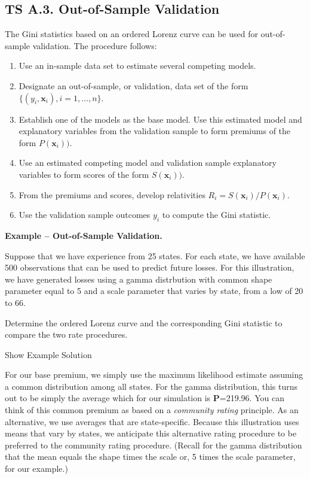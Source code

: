 \documentclass[]{book}
\providecommand{\tightlist}{%
  \setlength{\itemsep}{0pt}\setlength{\parskip}{0pt}}
\theoremstyle{definition}
\theoremstyle{definition}
\theoremstyle{definition}
\theoremstyle{remark}
\begin{document}
\subsection*{TS A.3. Out-of-Sample
Validation}\label{ts-a.3.-out-of-sample-validation}

The Gini statistics based on an ordered Lorenz curve can be used for
out-of-sample validation. The procedure follows:

\begin{enumerate}
\def\labelenumi{\arabic{enumi}.}
\tightlist
\item
  Use an in-sample data set to estimate several competing models.
\item
  Designate an out-of-sample, or validation, data set of the form
  \(\{(y_i, \mathbf{x}_i), i=1,\ldots,n\}\).
\item
  Establish one of the models as the base model. Use this estimated
  model and explanatory variables from the validation sample to form
  premiums of the form \(P(\mathbf{x}_i))\).
\item
  Use an estimated competing model and validation sample explanatory
  variables to form scores of the form \(S(\mathbf{x}_i))\).
\item
  From the premiums and scores, develop relativities
  \(R_i =S(\mathbf{x}_i)/P(\mathbf{x}_i)\).
\item
  Use the validation sample outcomes \(y_i\) to compute the Gini
  statistic.
\end{enumerate}

\textbf{Example -- Out-of-Sample Validation.}

Suppose that we have experience from 25 states. For each state, we have
available 500 observations that can be used to predict future losses.
For this illustration, we have generated losses using a gamma
distrbution with common shape parameter equal to 5 and a scale parameter
that varies by state, from a low of 20 to 66.

Determine the ordered Lorenz curve and the corresponding Gini statistic
to compare the two rate procedures.

Show Example Solution

\hypertarget{toggleExampleLor}{}
For our base premium, we simply use the maximum likelihood estimate
assuming a common distribution among all states. For the gamma
distribution, this turns out to be simply the average which for our
simulation is \textbf{P}=219.96. You can think of this common premium as
based on a \emph{community rating} principle. As an alternative, we use
averages that are state-specific. Because this illustration uses means
that vary by states, we anticipate this alternative rating procedure to
be preferred to the community rating procedure. (Recall for the gamma
distribution that the mean equals the shape times the scale or, 5 times
the scale parameter, for our example.)
\end{document}
